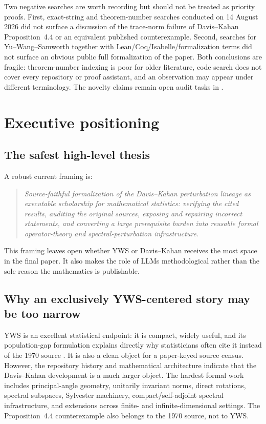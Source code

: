 \documentclass[11pt]{article}
\begin{document}
Two negative searches are worth recording but should not be treated as priority
proofs.  First, exact-string and theorem-number searches conducted on 14 August
2026 did not surface a discussion of the trace-norm failure of Davis--Kahan
Proposition~4.4 or an equivalent published counterexample.  Second, searches for
Yu--Wang--Samworth together with Lean/Coq/Isabelle/formalization terms did not
surface an obvious public full formalization of the paper.  Both conclusions are
fragile: theorem-number indexing is poor for older literature, code search does
not cover every repository or proof assistant, and an observation may appear
under different terminology.  The novelty claims remain open audit tasks in
.

\section{Executive positioning}
\label{sec:positioning}

\subsection{The safest high-level thesis}

A robust current framing is:

\begin{quote}
\emph{Source-faithful formalization of the Davis--Kahan perturbation lineage as
executable scholarship for mathematical statistics: verifying the cited
results, auditing the original sources, exposing and repairing incorrect
statements, and converting a large prerequisite burden into reusable formal
operator-theory and spectral-perturbation infrastructure.}
\end{quote}

This framing leaves open whether YWS or Davis--Kahan receives the most space in
the final paper.  It also makes the role of LLMs methodological rather than the
sole reason the mathematics is publishable.

\subsection{Why an exclusively YWS-centered story may be too narrow}

YWS is an excellent statistical endpoint: it is compact, widely useful, and its
population-gap formulation explains directly why statisticians often cite it
instead of the 1970 source \citep{yu2015davis,chen2021spectral}.  It is also a
clean object for a paper-keyed source census.  However, the repository history
and mathematical architecture indicate that the Davis--Kahan development is a
much larger object.  The hardest formal work includes principal-angle geometry,
unitarily invariant norms, direct rotations, spectral subspaces, Sylvester
machinery, compact/self-adjoint spectral infrastructure, and extensions across
finite- and infinite-dimensional settings.  The Proposition~4.4 counterexample
also belongs to the 1970 source, not to YWS.
\end{document}
